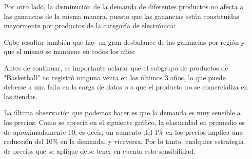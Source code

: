 \documentclass[12pt,a4paper]{article}
\begin{document}
Por otro lado, la disminución de la demanda de diferentes productos no afecta a las ganancias de la misma 
manera, puesto que las ganancias están constituídas mayormente por productos de la categoría de electrónica:

\begin{center}
\end{center}

Cabe resaltar también que hay un gran desbalance de las ganancias por región y que el mismo 
se mantiene en todos los años:

\begin{center}
\end{center}

Antes de continuar, es importante aclarar que el subgrupo de productos de "Basketball" no registró ninguna venta en los últimos 3 años, lo que puede deberse 
a una falla en la carga de datos o a que el producto no se comercializa en las tiendas.

\vspace{0.2cm}

\newpage

La última observación que podemos hacer es que la demanda es muy sensible a los precios. Como se aprecia en el siguiente gráfico, 
la elasticidad en promedio es de aproximadamente 10, es decir, un aumento del 1\% en los precios implica una reducción del 
10\% en la demanda, y viceversa. Por lo tanto, cualquier estrategia de precios que se aplique debe tener en cuenta 
esta sensibilidad.
\end{document}
